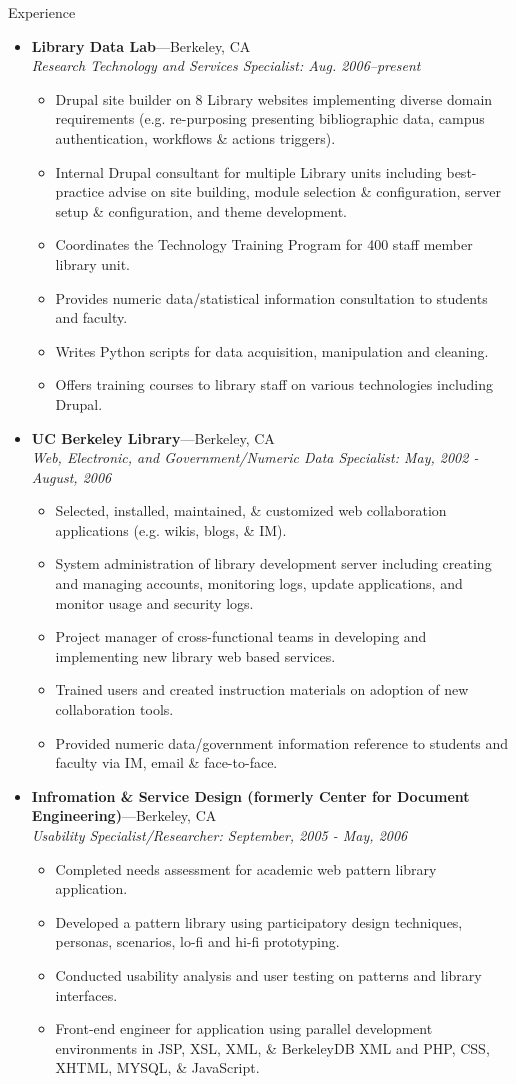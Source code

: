 \documentclass[11pt,oneside]{article}
\newenvironment{ressection}[1]{
	\vspace{4pt}
	{\fontfamily{phv}\selectfont\Large#1}
	\begin{itemize}
	\vspace{3pt}
}{
	\end{itemize}
}
\newcommand{\ressubitem}[1]{
	\vspace{-1pt}
	\item \begin{flushleft} #1 \end{flushleft}
}
\newcommand{\resbigitem}[3]{
	\vspace{-5pt}
	\item
	\textbf{#1}---#2 \\
	\textit{#3}
}
\newenvironment{ressubsec}[3]{
	\resbigitem{#1}{#2}{#3}
	\vspace{-2pt}
	\begin{itemize}
}{
	\end{itemize}
}
\begin{document}
\begin{ressection}{Experience}

	\begin{ressubsec}{Library Data Lab}{Berkeley, CA}{Research Technology and Services Specialist: Aug. 2006--present}
		\ressubitem{Drupal site builder on 8 Library websites implementing diverse domain requirements (e.g. re-purposing  presenting  bibliographic data, campus authentication, workflows \& actions  triggers).}
		\ressubitem{Internal Drupal consultant for multiple Library units including best-practice advise on site building, module selection \& configuration, server setup \& configuration, and theme development.}
		\ressubitem{Coordinates the Technology Training Program for 400 staff member library unit.}
		\ressubitem{Provides numeric data/statistical information consultation to students and faculty.}
		\ressubitem{Writes Python scripts for data acquisition, manipulation and cleaning.}
		\ressubitem{Offers training courses to library staff on various technologies including Drupal.}
	\end{ressubsec}

	\begin{ressubsec}{UC Berkeley Library}{Berkeley, CA}{Web, Electronic, and Government/Numeric Data Specialist: May, 2002 - August, 2006}
		\ressubitem{Selected, installed, maintained, \& customized web collaboration applications (e.g. wikis, blogs, \& IM).}
		\ressubitem{System administration of library development server including creating and managing accounts, monitoring logs, update applications, and monitor usage and security logs.}
		\ressubitem{Project manager of cross-functional teams in developing and implementing new library web based services.}
		\ressubitem{Trained users and created instruction materials on adoption of new collaboration tools.}
		\ressubitem{Provided numeric data/government information reference to students and faculty via IM, email \& face-to-face.}		
	\end{ressubsec}
	
	\begin{ressubsec}{Infromation \& Service Design (formerly Center for Document Engineering)}{Berkeley, CA}{Usability Specialist/Researcher: September, 2005 - May, 2006}
	  \ressubitem{Completed needs assessment for academic web pattern library application.}
	  \ressubitem{Developed a pattern library using participatory design techniques, personas, scenarios, lo-fi and hi-fi prototyping.}
	  \ressubitem{Conducted usability analysis and user testing on patterns and library interfaces.}
	  \ressubitem{Front-end engineer for application using parallel development environments in JSP, XSL, XML, \& BerkeleyDB XML and PHP, CSS, XHTML, MYSQL, \& JavaScript.}
	\end{ressubsec}
\end{ressection}
\end{document}
